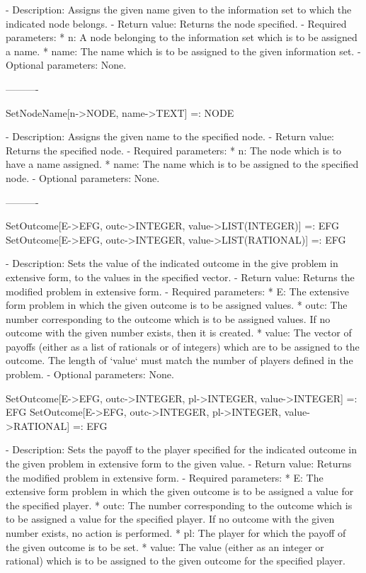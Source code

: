    -	Description:  Assigns the given name given to the information set to 
	which the indicated node belongs.
   -	Return value:  Returns the node specified.
   -	Required parameters:
	  *  n:  A node belonging to the information set which is to be 
		assigned a name.
	  *  name:  The name which is to be assigned to the given information
		set.
   -	Optional parameters:  None.

----------

SetNodeName[n->NODE, name->TEXT] =: NODE

   -	Description:  Assigns the given name to the specified node.
   -	Return value:  Returns the specified node.
   -	Required parameters:
	  *  n:  The node which is to have a name assigned.
	  *  name:  The name which is to be assigned to the specified node.
   -	Optional parameters:  None.

----------

SetOutcome[E->EFG, outc->INTEGER, value->LIST(INTEGER)] =: EFG
SetOutcome[E->EFG, outc->INTEGER, value->LIST(RATIONAL)] =: EFG

   -	Description:  Sets the value of the indicated outcome in the give 
	problem in extensive form, to the values in the specified vector.
   -	Return value:  Returns the modified problem in extensive form. 
   -	Required parameters:
	  *  E:  The extensive form problem in which the given outcome is to be
		assigned values.
	  *  outc:  The number corresponding to the outcome which is to be 
		assigned values.  If no outcome with the given number exists,
		then it is created.
	  *  value:  The vector of payoffs (either as a list of rationals or of
		integers) which are to be assigned to the outcome.  The length
		of `value` must match the number of players defined in the 
		problem.
   -	Optional parameters:  None.


SetOutcome[E->EFG, outc->INTEGER, pl->INTEGER, value->INTEGER] =: EFG
SetOutcome[E->EFG, outc->INTEGER, pl->INTEGER, value->RATIONAL] =: EFG

   -	Description:  Sets the payoff to the player specified for the indicated
	outcome in the given problem in extensive form to the given value.
   -	Return value:  Returns the modified problem in extensive form.
   -	Required parameters:
	  *  E:  The extensive form problem in which the given outcome is to be
		assigned a value for the specified player.
	  *  outc:  The number corresponding to the outcome which is to be 
		assigned a value for the specified player.  If no outcome with
		 the given number exists, no action is performed.
	  *  pl:  The player for which the payoff of the given outcome is to be
		set.
	  *  value:  The value (either as an integer or rational) which is to
		be assigned to the given outcome for the specified player.

